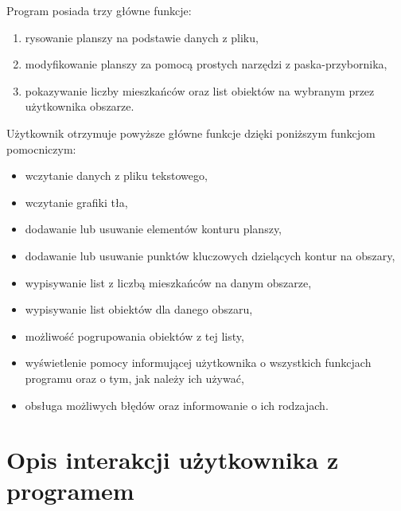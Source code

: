 \documentclass[a4paper,12pt]{article}
\newcommand\tab[1][0.6cm]{\hspace*{#1} }
\begin{document}
\tab Program posiada trzy główne funkcje:
\begin{enumerate}
\item rysowanie planszy na podstawie danych z pliku,
\item modyfikowanie planszy za pomocą prostych narzędzi z paska-przybornika,
\item pokazywanie liczby mieszkańców oraz list obiektów na wybranym przez użytkownika obszarze.
\end{enumerate}
\tab Użytkownik otrzymuje powyższe główne funkcje dzięki poniższym funkcjom pomocniczym:
\begin{itemize}
\item wczytanie danych z pliku tekstowego,
\item wczytanie grafiki tła,
\item dodawanie lub usuwanie elementów konturu planszy,
\item dodawanie lub usuwanie punktów kluczowych dzielących kontur na obszary,
\item wypisywanie list z liczbą mieszkańców na danym obszarze,
\item wypisywanie list obiektów dla danego obszaru,
\item możliwość pogrupowania obiektów z tej listy,
\item wyświetlenie pomocy informującej użytkownika o wszystkich funkcjach programu oraz o tym, jak należy ich używać,
\item obsługa możliwych błędów oraz informowanie o ich rodzajach.
\end{itemize}

\section{Opis interakcji użytkownika z programem}
\end{document}
